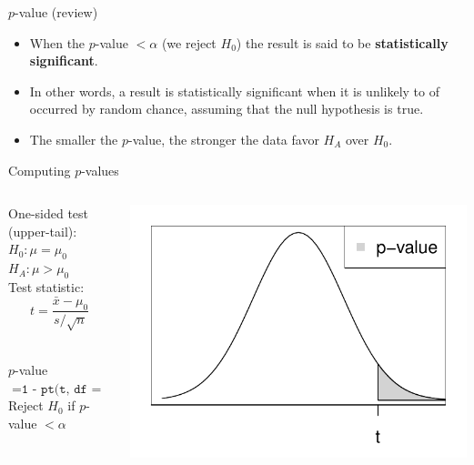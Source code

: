 \documentclass[fleqn, 10pt]{beamer}\usepackage[]{graphicx}\usepackage[]{color}
\begin{document}
\begin{frame}{$p$-value (review)}
\begin{itemize}
\item When the $p$-value $< \alpha$ (we reject $H_0$) the result is said to be \textbf{statistically significant}.
\vspace{10pt}
\item In other words, a result is statistically significant when it is unlikely to of occurred by random chance, assuming that the null hypothesis is true.
\vspace{10pt}
\item The smaller the $p$-value, the stronger the data favor $H_A$ over $H_0$.
\end{itemize}
\end{frame}

\begin{frame}{Computing $p$-values}
\begin{columns}
\begin{column}{0.55\textwidth}
One-sided test (upper-tail):\\
$H_0: \mu = \mu_0$\\
$H_A: \mu > \mu_0$\\
\vspace{10pt}
Test statistic:\\
$$t = \frac{\bar{x} - \mu_0}{s/\sqrt{n}}$$\\
\vspace{10pt}

$p$-value $= \texttt{1 - pt(t, df = n-1)}$\\ 
\vspace{10pt}
Reject $H_0$ if $p$-value $< \alpha$\\
\end{column}
\begin{column}{0.45\textwidth}
\includegraphics[scale=0.5]{figure/pvalue_upper.pdf}
\end{column}
\end{columns}
\vspace{1cm}
\end{frame}
\end{document}
